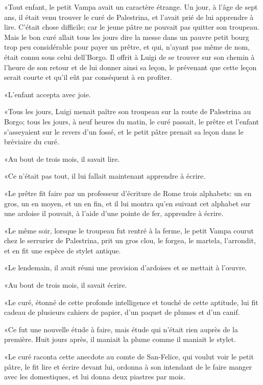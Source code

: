 «Tout enfant, le petit Vampa avait un caractère étrange. Un jour, à l'âge de sept ans, il était venu trouver le curé de Palestrina, et l'avait prié de lui apprendre à lire. C'était chose difficile; car le jeune pâtre ne pouvait pas quitter son troupeau. Mais le bon curé allait tous les jours dire la messe dans un pauvre petit bourg trop peu considérable pour payer un prêtre, et qui, n'ayant pas même de nom, était connu sous celui dell'Borgo. Il offrit à Luigi de se trouver sur son chemin à l'heure de son retour et de lui donner ainsi sa leçon, le prévenant que cette leçon serait courte et qu'il eût par conséquent à en profiter. 

«L'enfant accepta avec joie. 

«Tous les jours, Luigi menait paître son troupeau sur la route de Palestrina au Borgo; tous les jours, à neuf heures du matin, le curé passait, le prêtre et l'enfant s'asseyaient sur le revers d'un fossé, et le petit pâtre prenait sa leçon dans le bréviaire du curé. 

«Au bout de trois mois, il savait lire. 

«Ce n'était pas tout, il lui fallait maintenant apprendre à écrire. 

«Le prêtre fit faire par un professeur d'écriture de Rome trois alphabets: un en gros, un en moyen, et un en fin, et il lui montra qu'en suivant cet alphabet sur une ardoise il pouvait, à l'aide d'une pointe de fer, apprendre à écrire. 

«Le même soir, lorsque le troupeau fut rentré à la ferme, le petit Vampa courut chez le serrurier de Palestrina, prit un gros clou, le forgea, le martela, l'arrondit, et en fit une espèce de stylet antique. 

«Le lendemain, il avait réuni une provision d'ardoises et se mettait à l'œuvre. 

«Au bout de trois mois, il savait écrire. 

«Le curé, étonné de cette profonde intelligence et touché de cette aptitude, lui fit cadeau de plusieurs cahiers de papier, d'un paquet de plumes et d'un canif. 

«Ce fut une nouvelle étude à faire, mais étude qui n'était rien auprès de la première. Huit jours après, il maniait la plume comme il maniait le stylet. 

«Le curé raconta cette anecdote au comte de San-Felice, qui voulut voir le petit pâtre, le fit lire et écrire devant lui, ordonna à son intendant de le faire manger avec les domestiques, et lui donna deux piastres par mois. 

